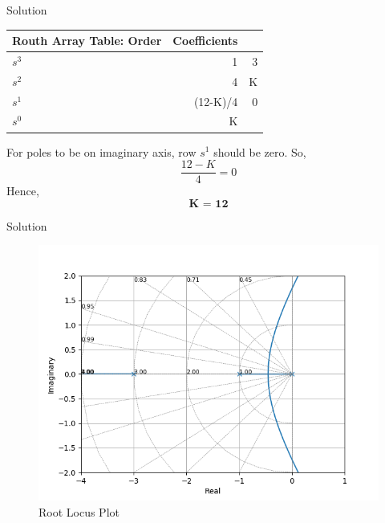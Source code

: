 \documentclass{beamer}
\begin{document}
\begin{frame}{Solution}

\begin{table}
\centering
\begin{tabular}{l|r r}
Routh Array Table:
Order & Coefficients\\\hline
$s^3$ & 1 & 3 \\
$s^2$ & 4 & K \\
$s^1$ & (12-K)/4 & 0\\
$s^0$ & K & 
\end{tabular}

\end{table}

For poles to be on imaginary axis, row $s^1$ should be zero.\newline
So, \[\frac{12-K}{4} = 0\]
\newline Hence, $$\textbf{K = 12}$$


\end{frame}

\begin{frame}{Solution}
\begin{figure}
\includegraphics[width=250 pt]{Root_Locus.png}
\caption{\label{fig:your-figure}Root Locus Plot}
\end{figure}


\end{frame}
\end{document}
